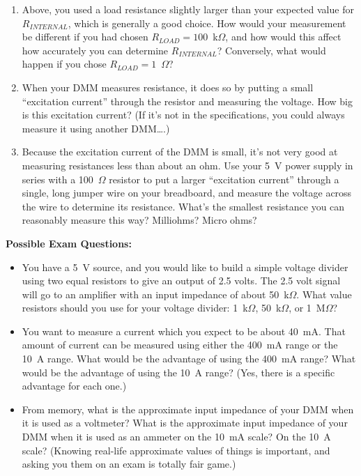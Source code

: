 \begin{enumerate}[wide]
\item Above, you used a load resistance slightly larger than your expected value for $R_{INTERNAL}$, which is generally a good choice.  How would your measurement be different if you had chosen  $R_{LOAD} = 100$~k$\Omega$, and how  would this affect how accurately you can determine $R_{INTERNAL}$?  Conversely, what would happen if you chose $R_{LOAD} = 1$~$\Omega$?  

\item When your DMM measures resistance, it does so by putting a small ``excitation current'' through the resistor and measuring the voltage.  How big is this excitation current?   (If it's not in the specifications, you could always measure it using another DMM….) 

\item Because the excitation current of the DMM is small, it's not very good at measuring resistances less than about an ohm.  Use your 5~V power supply in series with a 100~$\Omega$ resistor to put a larger ``excitation current'' through a single, long jumper wire on your breadboard, and measure the voltage across the wire to determine its resistance.  What's the smallest resistance you can reasonably measure this way?  Milliohms?  Micro ohms?  


\end{enumerate}


\textbf{Possible Exam Questions:}

\begin{itemize}
\item You have a 5~V source, and you would like to build a simple voltage divider using two equal resistors to give an output of 2.5 volts.  The 2.5 volt signal will go to an amplifier with an input impedance of about 50~k$\Omega$.  What value resistors should you use for your voltage divider: 1~k$\Omega$, 50~k$\Omega$, or 1~M$\Omega$?

\item You want to measure a current which you expect to be about 40~mA.  That amount of current can be measured using either the 400~mA range or the 10~A range.  What would be the advantage of using the 400~mA range?  What would be the advantage of using the 10~A range? (Yes, there is a specific advantage for each one.)  

\item From memory, what is the approximate input impedance of your DMM when it is used as a voltmeter?  What is the approximate input impedance of your DMM when it is used as an ammeter on the 10~mA scale?  On the 10~A scale?  (Knowing real-life approximate values of things is important, and asking you them on an exam is totally fair game.)
\end{itemize}





